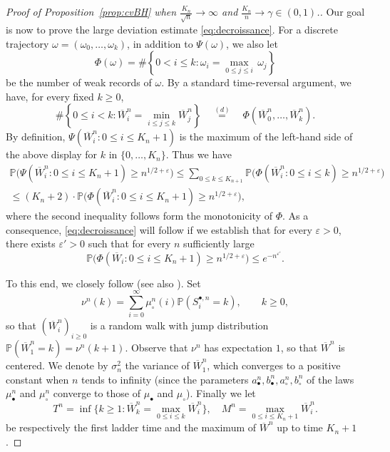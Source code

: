 \documentclass[AHL,XML,longabstracts,Unicode]{cedram}
\renewcommand{\P}{\mathbb{P}}
\def\eps{\varepsilon}
\def\mub{\mu_{\bullet}}
\def\muc{\mu_{\circ}}
\def\mubn{\mu_{\bullet}^{n}}
\def\mucn{\mu_{\circ}^{n}}
\def\Sbn{S^{\bullet,n}}
\renewcommand{\epsilon}{\varepsilon}
\renewcommand\Pr[1]{\mathbb{P}\left(#1\right)}
\begin{document}
\begin{proof}[Proof of  Proposition~\ref{prop:cvBH}  when $\tfrac{K_{n}}{\sqrt{n}} \rightarrow \infty$ and $ \tfrac{K_{n}}{n}  \rightarrow \gamma \in (0,1)$.]
Our goal is now to prove the large deviation estimate \eqref{eq:decroissance}.
For a discrete trajectory
\hbox{$\omega=(\omega_0,\dots,\omega_{k})$},
in addition to $\Psi(\omega)$, we also let
\[\Phi(\omega)=\# \left\{0 < i \leq k: \omega_{i}=\max_{0 \leq j \leq i} \, \omega_{j} \right \}\]
be the number of weak records of $\omega$.
By a standard time-reversal argument, we have, for every fixed $k \geq 0$,
\[
\# \left\{0 \le i <k:  \overline{W}^{n}_{i}=\min_{i \leq j \leq k}  \overline{W}^{n}_{j} \right\}
\quad \stackrel{(d)}{=} \quad
\Phi(\overline{W}^{n}_0,\dots,\overline{W}^{n}_k).
\]
By definition, $\Psi( \overline{W}^{n}_{i} :0 \leq i \leq K_{n}+1)$ is the maximum
of the left-hand side of the above display for $k$ in $\{0,\dots,K_n\}$.
Thus we have
\begin{multline*}
\P\Big(\Psi( \overline{W}^{n}_{i} :0 \leq i \leq K_{n}+1) \geq n^{1/2+\epsilon}
\Big)  \leq  \sum_{0 \leq k \leq K_{n+1}} \P\Big(\Phi( \overline{W}^{n}_{i} :0 \leq i \leq k) \geq n^{1/2+\epsilon} \Big)\\
 \leq (K_n+2) \cdot \P\Big(\Phi( \overline{W}^{n}_{i} :0 \leq i \leq K_{n}+1) \geq n^{1/2+\epsilon} \Big),
\end{multline*}
where the second inequality follows form the monotonicity of $\Phi$.
As a consequence, \eqref{eq:decroissance} will follow if we establish that
for every $\eps>0$, there exists $\epsilon'>0$ such that for every $n$ sufficiently large
\begin{equation}
  \label{eq:decroissancePhi} \P\big(\Phi( \overline{W}_{i} :0 \leq i \leq K_{n}+1) \geq n^{1/2+\epsilon}
  \big) \leq e^{-n^{\epsilon'}}.
\end{equation}




 To this end, we closely follow \cite{MM03} (see also \cite[Sec.~1.3]{LG05}). Set
\[\nu^{n}(k)=\sum_{ i=0}^{\infty}\mucn(i) \Pr{\Sbn_{i}=k},\qquad k \geq 0,\]
so that  $(\overline{W}^{n}_{i})_{i \geq 0}$ is a random walk  with jump distribution
$\Pr{\overline{W}^{n}_{1}=k}=\nu^{n}(k+1)$.
Observe that $\nu^{n}$ has expectation $1$,
so that $\overline{W}^{n}$ is centered.
We denote by $\sigma_{n}^{2}$  the variance of $\overline{W}^{n}_1$,
which converges to a positive constant when $n$ tends to infinity
(since the parameters $a_\bullet^n,b_\bullet^n,a_\circ^n,b_\circ^n$
of the laws $\mubn$ and $\mucn$ converge to those of $\mub$ and $\muc$).
Finally we let
\[
  T^{n}= \inf \Big\{k \geq 1 : \overline{W}^{n}_{k}= \max_{0 \leq i \leq k} \overline{W}^{n}_{i} \Big\}, \quad M^n = \max_{0 \le i \le {K_n+1}} \overline{W}^{n}_i.
\]
be respectively the first ladder time and the maximum of $\overline{W}^{n}$ up to time $K_{n}+1$.


\end{proof}
\end{document}
